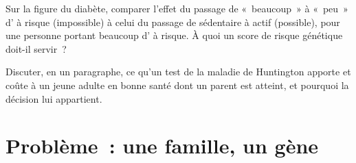 \begin{exercise}[$\star\star\star$]\label{exo:g11:genes-and-disease:14}
Sur la figure du diabète, comparer l'effet du passage de «~beaucoup~» à
«~peu~» d' à risque (impossible) à celui du passage de
sédentaire à actif (possible), pour une personne portant beaucoup
d' à risque. À quoi un score de risque génétique doit-il servir~?
\end{exercise}

\begin{exercise}[$\star\star\star$]\label{exo:g11:genes-and-disease:15}
Discuter, en un paragraphe, ce qu'un test de la maladie de Huntington
apporte et coûte à un jeune adulte en bonne santé dont un parent est
atteint, et pourquoi la décision lui appartient.
\end{exercise}

\section{Problème~: une famille, un gène}

